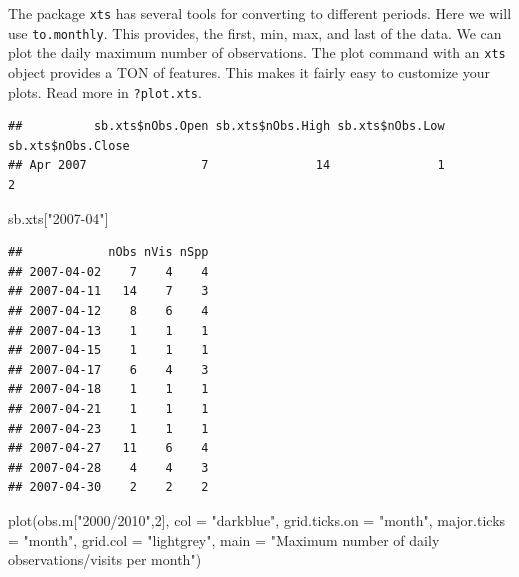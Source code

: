\documentclass[
  10pt,
]{article}
\newenvironment{Shaded}{\begin{snugshade}}{\end{snugshade}}
\newcommand{\AttributeTok}[1]{\textcolor[rgb]{0.77,0.63,0.00}{#1}}
\newcommand{\DecValTok}[1]{\textcolor[rgb]{0.00,0.00,0.81}{#1}}
\newcommand{\FunctionTok}[1]{\textcolor[rgb]{0.00,0.00,0.00}{#1}}
\newcommand{\NormalTok}[1]{#1}
\newcommand{\OtherTok}[1]{\textcolor[rgb]{0.56,0.35,0.01}{#1}}
\newcommand{\SpecialCharTok}[1]{\textcolor[rgb]{0.00,0.00,0.00}{#1}}
\newcommand{\StringTok}[1]{\textcolor[rgb]{0.31,0.60,0.02}{#1}}
\begin{document}
The package \texttt{xts} has several tools for converting to different periods. Here we will use \texttt{to.monthly}. This provides, the first, min, max, and last of the data. We can plot the daily maximum number of observations. The plot command with an \texttt{xts} object provides a TON of features. This makes it fairly easy to customize your plots. Read more in \texttt{?plot.xts}.

\begin{Shaded}
\end{Shaded}

\begin{verbatim}
##          sb.xts$nObs.Open sb.xts$nObs.High sb.xts$nObs.Low sb.xts$nObs.Close
## Apr 2007                7               14               1                 2
\end{verbatim}

\begin{Shaded}
\begin{Highlighting}[]
\NormalTok{sb.xts[}\StringTok{"2007{-}04"}\NormalTok{]}
\end{Highlighting}
\end{Shaded}

\begin{verbatim}
##            nObs nVis nSpp
## 2007-04-02    7    4    4
## 2007-04-11   14    7    3
## 2007-04-12    8    6    4
## 2007-04-13    1    1    1
## 2007-04-15    1    1    1
## 2007-04-17    6    4    3
## 2007-04-18    1    1    1
## 2007-04-21    1    1    1
## 2007-04-23    1    1    1
## 2007-04-27   11    6    4
## 2007-04-28    4    4    3
## 2007-04-30    2    2    2
\end{verbatim}

\begin{Shaded}
\begin{Highlighting}[]
\FunctionTok{plot}\NormalTok{(obs.m[}\StringTok{"2000/2010"}\NormalTok{,}\DecValTok{2}\NormalTok{], }
     \AttributeTok{col =} \StringTok{"darkblue"}\NormalTok{, }
     \AttributeTok{grid.ticks.on =} \StringTok{"month"}\NormalTok{, }
     \AttributeTok{major.ticks =} \StringTok{"month"}\NormalTok{, }
     \AttributeTok{grid.col =} \StringTok{"lightgrey"}\NormalTok{,  }
     \AttributeTok{main =} \StringTok{"Maximum number of daily observations/visits per month"}\NormalTok{)}
\end{Highlighting}
\end{Shaded}
\end{document}

